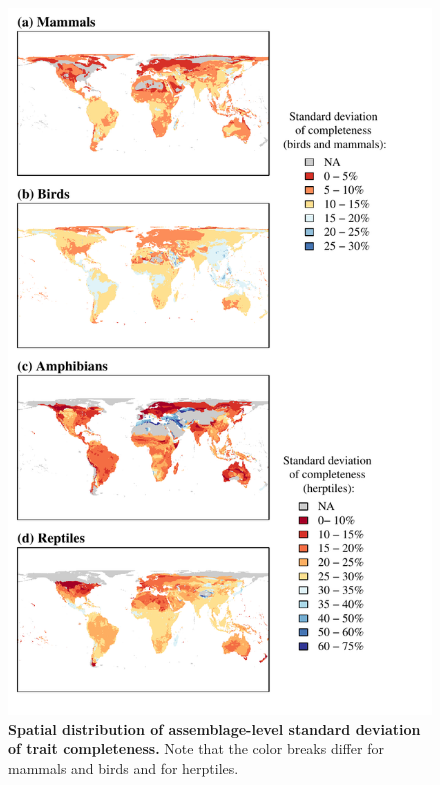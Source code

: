\newpage
\begin{figure}[h!]
\vspace*{-2cm}
\centering
\includegraphics[scale=0.95]{Supporting/Chapter2/Figures/Maps/sd_map}
\caption[Spatial distribution of assemblage-level mean trait completeness in herptiles.]{\textbf{Spatial distribution of  assemblage-level standard deviation of trait completeness.} Note that the color breaks differ for mammals and birds and for herptiles.}
\label{}
\end{figure}


